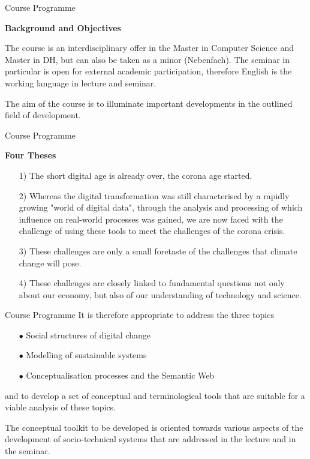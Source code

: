 \documentclass{beamer}
\newcommand{\ueberschrift}[1]{\begin{center}\bf #1\end{center}}
\begin{document}
\begin{frame}{Course Programme}

\ueberschrift{Background and Objectives}

The course is an interdisciplinary offer in the Master in Computer Science and
Master in DH, but can also be taken as a minor (Nebenfach).  The seminar in
particular is open for external academic participation, therefore English is
the working language in lecture and seminar.

The aim of the course is to illuminate important developments in the outlined
field of development.  
\end{frame}

\begin{frame}{Course Programme}
\ueberschrift{Four Theses}
\begin{itemize}
\item[1)] The short digital age is already over, the corona age started.
\item[2)] Whereas the digital transformation was still characterised by a
  rapidly growing "world of digital data", through the analysis and processing
  of which influence on real-world processes was gained, we are now faced with
  the challenge of using these tools to meet the challenges of the corona
  crisis.
\item[3)] These challenges are only a small foretaste of the challenges that
  climate change will pose.
\item[4)] These challenges are closely linked to fundamental questions not
  only about our economy, but also of our understanding of technology and
  science.
\end{itemize}
\end{frame}

\begin{frame}{Course Programme}
It is therefore appropriate to address the three topics

\begin{itemize}
\item[$\bullet$] Social structures of digital change
\item[$\bullet$] Modelling of sustainable systems
\item[$\bullet$] Conceptualisation processes and the Semantic Web
\end{itemize}
and to develop a set of conceptual and terminological tools that are suitable
for a viable analysis of these topics.

The conceptual toolkit to be developed is oriented towards various aspects of
the development of socio-technical systems that are addressed in the lecture
and in the seminar.
\end{frame}
\end{document}
